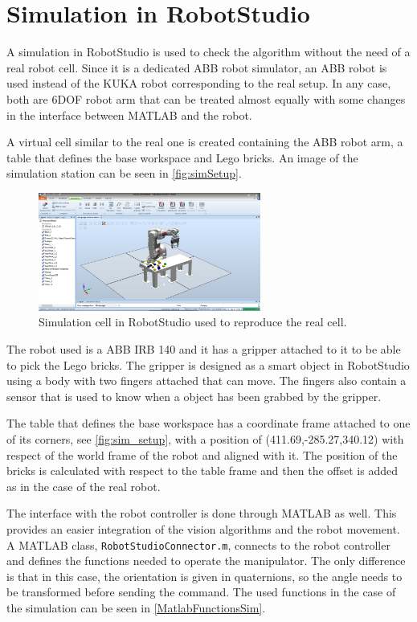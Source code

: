 \chapter{Simulation in RobotStudio}\label{chap:simulation}
A simulation in RobotStudio \cite{robotStudio} is used to check the algorithm without the need of a real robot cell. Since it is a dedicated ABB robot simulator, an ABB robot is used instead of the KUKA robot corresponding to the real setup. In any case, both are 6DOF robot arm that can be treated almost equally with some changes in the interface between MATLAB and the robot. 

A virtual cell similar to the real one is created containing the ABB robot arm, a table that defines the base workspace and Lego bricks. An image of the simulation station can be seen in \autoref{fig:simSetup}.
\begin{figure}[H]
    \includegraphics[width=0.65\textwidth]{figures/sim_setup.png}
    \caption{Simulation cell in RobotStudio used to reproduce the real cell.}
    \label{fig:simSetup}
\end{figure}

The robot used is a ABB IRB 140 \cite{abb} and it has a gripper attached to it to be able to pick the Lego bricks. The gripper is designed as a smart object in RobotStudio using a body with two fingers attached that can move. The fingers also contain a sensor that is used to know when a object has been grabbed by the gripper.

The table that defines the base workspace has a coordinate frame attached to one of its corners, see \autoref{fig:sim_setup}, with a position of (411.69,-285.27,340.12) with respect of the world frame of the robot and aligned with it. The position of the bricks is calculated with respect to the table frame and then the offset is added as in the case of the real robot.

The interface with the robot controller is done through MATLAB as well. This provides an easier integration of the vision algorithms and the robot movement. A MATLAB class, \lstinline[style=matlabinline]{RobotStudioConnector.m}, connects to the robot controller and defines the functions needed to operate the manipulator. The only difference is that in this case, the orientation is given in quaternions, so the angle needs to be transformed before sending the command. The used functions in the case of the simulation can be seen in \autoref{MatlabFunctionsSim}.

